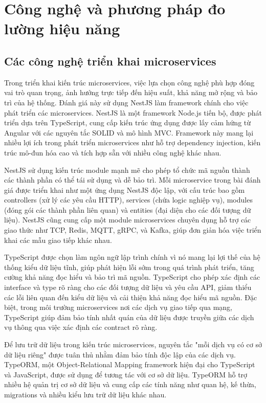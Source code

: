 \section{Công nghệ và phương pháp đo lường hiệu năng}

\subsection{Các công nghệ triển khai microservices}
Trong triển khai kiến trúc microservices, việc lựa chọn công nghệ phù hợp đóng vai trò quan trọng, ảnh hưởng trực tiếp đến hiệu suất, khả năng mở rộng và bảo trì của hệ thống. Đánh giá này sử dụng NestJS làm framework chính cho việc phát triển các microservices. NestJS là một framework Node.js tiến bộ, được phát triển dựa trên TypeScript, cung cấp kiến trúc ứng dụng được lấy cảm hứng từ Angular với các nguyên tắc SOLID và mô hình MVC. Framework này mang lại nhiều lợi ích trong phát triển microservices như hỗ trợ dependency injection, kiến trúc mô-đun hóa cao và tích hợp sẵn với nhiều công nghệ khác nhau.

NestJS sử dụng kiến trúc module mạnh mẽ cho phép tổ chức mã nguồn thành các thành phần có thể tái sử dụng và dễ bảo trì. Mỗi microservice trong bài đánh giá được triển khai như một ứng dụng NestJS độc lập, với cấu trúc bao gồm controllers (xử lý các yêu cầu HTTP), services (chứa logic nghiệp vụ), modules (đóng gói các thành phần liên quan) và entities (đại diện cho các đối tượng dữ liệu). NestJS cũng cung cấp một module microservices chuyên dụng hỗ trợ các giao thức như TCP, Redis, MQTT, gRPC, và Kafka, giúp đơn giản hóa việc triển khai các mẫu giao tiếp khác nhau.

TypeScript được chọn làm ngôn ngữ lập trình chính vì nó mang lại lợi thế của hệ thống kiểu dữ liệu tĩnh, giúp phát hiện lỗi sớm trong quá trình phát triển, tăng cường khả năng đọc hiểu và bảo trì mã nguồn. TypeScript cho phép xác định các interface và type rõ ràng cho các đối tượng dữ liệu và yêu cầu API, giảm thiểu các lỗi liên quan đến kiểu dữ liệu và cải thiện khả năng đọc hiểu mã nguồn. Đặc biệt, trong môi trường microservices nơi các dịch vụ giao tiếp qua mạng, TypeScript giúp đảm bảo tính nhất quán của dữ liệu được truyền giữa các dịch vụ thông qua việc xác định các contract rõ ràng.

Để lưu trữ dữ liệu trong kiến trúc microservices, nguyên tắc "mỗi dịch vụ có cơ sở dữ liệu riêng" được tuân thủ nhằm đảm bảo tính độc lập của các dịch vụ. TypeORM, một Object-Relational Mapping framework hiện đại cho TypeScript và JavaScript, được sử dụng để tương tác với cơ sở dữ liệu. TypeORM hỗ trợ nhiều hệ quản trị cơ sở dữ liệu và cung cấp các tính năng như quan hệ, kế thừa, migrations và nhiều kiểu lưu trữ dữ liệu khác nhau.

